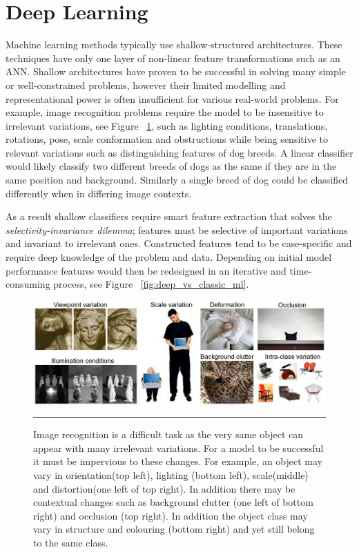 \section{Deep Learning}\label{sec:deep_learning}
Machine learning methods typically use shallow-structured architectures.
These techniques have only one layer of non-linear feature transformations such as an ANN\citep{dengthree}.
Shallow architectures have proven to be successful in solving many simple or well-constrained problems, however their limited modelling and representational power is often insufficient for various real-world problems.
For example, image recognition\citep{dengthree} problems require the model to be insensitive to irrelevant variations, see Figure ~\ref{fig:Image_challenges}, such as lighting conditions, translations, rotations, pose, scale conformation and obstructions\citep{liu2014deep} while being sensitive to relevant variations such as distinguishing features of dog breeds.
A linear classifier would likely classify two different breeds of dogs as the same if they are in the same position and background.
Similarly a single breed of dog could be classified differently when in differing image contexts.

As a result shallow classifiers require smart feature extraction that solves the \textit{selectivity-invariance dilemma}; features must be selective of important variations and invariant to irrelevant ones.
Constructed features tend to be case-specific and require deep knowledge of the problem and data\citep{bengio2009advances}.
Depending on initial model performance features would then be redesigned in an iterative and time-consuming process, see Figure ~\ref{fig:deep_vs_classic_ml}.
\begin{figure}[htbp]
	\centering
		\includegraphics[width = 1.0\textwidth]{./Figures/challenges.jpeg}
		\rule{35em}{0.5pt}
	\caption[Image Recognition]{Image recognition is a difficult task as the very same object can appear with many irrelevant variations. For a model to be successful it must be impervious to these changes. For example, an object may vary in orientation(top left), lighting (bottom left), scale(middle) and distortion(one left of top right). In addition there may be contextual changes such as background clutter (one left of bottom right) and occlusion (top right). In addition the object class may vary in structure and colouring (bottom right) and yet still belong to the same class.}
	\label{fig:Image_challenges}
\end{figure}

